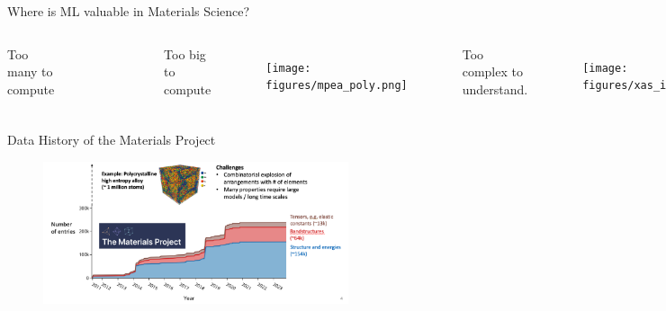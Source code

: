 \documentclass[aspectratio=169]{beamer}
\begin{document}
    \begin{frame}[t]{Where is ML valuable in Materials Science?}
        \begin{columns}[t]
            Too many to compute
            \begin{figure}
                \centering
                \includegraphics[width=\textwidth]{figures/mp_data_hist.png}
            \end{figure}
            Too big to compute
            \begin{figure}
                \centering
                \texttt{[image: figures/mpea\_poly.png]}
            \end{figure}
            Too complex to understand.
            \begin{figure}
                \centering
                \texttt{[image: figures/xas\_interpretation.png]}
            \end{figure}
        \end{columns}
    \end{frame}


    \begin{frame}{Data History of the Materials Project}
        \begin{figure}
            \centering
            \includegraphics[width=0.8\textwidth]{figures/mp_data_hist.png}
        \end{figure}
    \end{frame}
\end{document}
